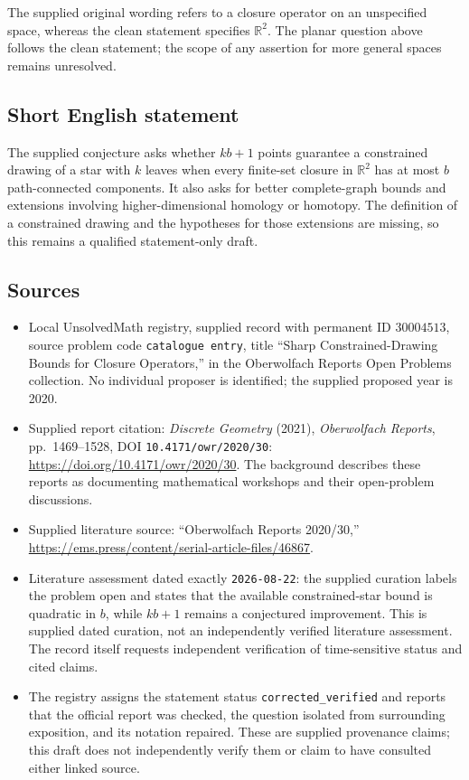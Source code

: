 \documentclass[11pt]{article}
\newcommand{\R}{\mathbb{R}}
\begin{document}
The supplied original wording refers to a closure operator on an unspecified space, whereas the clean statement specifies \(\R^2\). The planar question above follows the clean statement; the scope of any assertion for more general spaces remains unresolved.
\subsection{Short English statement}
The supplied conjecture asks whether \(kb+1\) points guarantee a constrained drawing of a star with \(k\) leaves when every finite-set closure in \(\R^2\) has at most \(b\) path-connected components. It also asks for better complete-graph bounds and extensions involving higher-dimensional homology or homotopy. The definition of a constrained drawing and the hypotheses for those extensions are missing, so this remains a qualified statement-only draft.
\subsection{Sources}
\begin{itemize}
\item Local UnsolvedMath registry, supplied record with permanent ID \(30004513\), source problem code \texttt{catalogue entry}, title ``Sharp Constrained-Drawing Bounds for Closure Operators,'' in the Oberwolfach Reports Open Problems collection. No individual proposer is identified; the supplied proposed year is 2020.
\item Supplied report citation: \emph{Discrete Geometry} (2021), \emph{Oberwolfach Reports}, pp.\ 1469--1528, DOI \texttt{10.4171/owr/2020/30}: \url{https://doi.org/10.4171/owr/2020/30}. The background describes these reports as documenting mathematical workshops and their open-problem discussions.
\item Supplied literature source: ``Oberwolfach Reports 2020/30,'' \url{https://ems.press/content/serial-article-files/46867}.
\item Literature assessment dated exactly \texttt{2026-08-22}: the supplied curation labels the problem open and states that the available constrained-star bound is quadratic in \(b\), while \(kb+1\) remains a conjectured improvement. This is supplied dated curation, not an independently verified literature assessment. The record itself requests independent verification of time-sensitive status and cited claims.
\item The registry assigns the statement status \texttt{corrected\_verified} and reports that the official report was checked, the question isolated from surrounding exposition, and its notation repaired. These are supplied provenance claims; this draft does not independently verify them or claim to have consulted either linked source.
\end{itemize}
\end{document}
